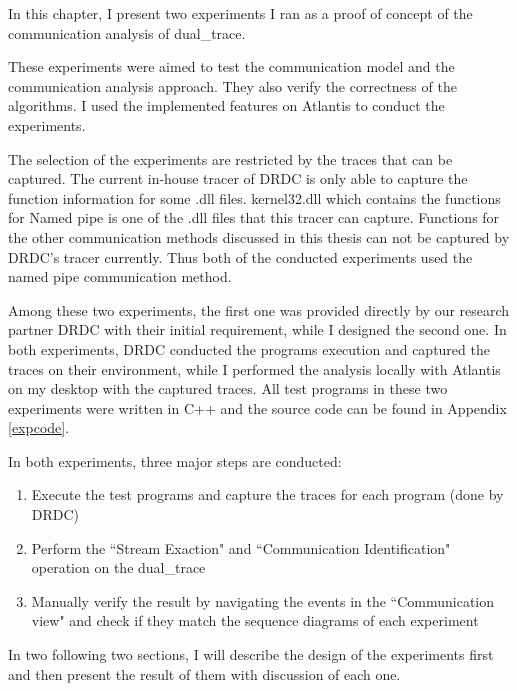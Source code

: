 


\label{chapter:Exp}
In this chapter, I present two experiments I ran as a proof of concept of the communication analysis of dual\_trace.

These experiments were aimed to test the communication model and the communication analysis approach. They also verify the correctness of the algorithms. I used the implemented features on Atlantis to conduct the experiments.

The selection of the experiments are restricted by the traces that can be captured. The current in-house tracer of DRDC is only able to capture the function information for some .dll files. kernel32.dll which contains the functions for Named pipe is one of the .dll files that this tracer can capture. Functions for the other communication methods discussed in this thesis can not be captured by DRDC's tracer currently.  Thus both of the conducted experiments used the named pipe communication method. 

Among these two experiments, the first one was provided directly by our research partner DRDC with their initial requirement, while I designed the second one. In both experiments, DRDC conducted the programs execution and captured the traces on their environment, while I performed the analysis locally with Atlantis on my desktop with the captured traces. All test programs in these two experiments were written in C++ and the source code can be found in Appendix \ref{expcode}. 

In both experiments, three major steps are conducted:
\begin{enumerate}
\item Execute the test programs and capture the traces for each program (done by DRDC)

\item Perform the ``Stream Exaction" and ``Communication Identification" operation on the dual\_trace

\item Manually verify the result by navigating the events in the ``Communication view" and check if they match the sequence diagrams of each experiment
\end{enumerate}

In two following two sections, I will describe the design of the experiments first and then present the result of them with discussion of each one.

